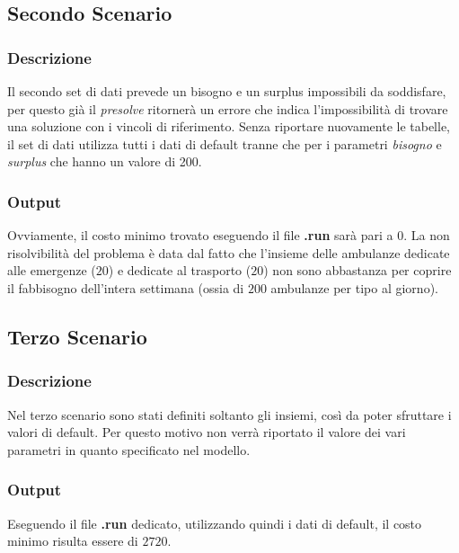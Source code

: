 \subsection{Secondo Scenario}
\subsubsection{Descrizione}
Il secondo set di dati prevede un bisogno e un surplus impossibili da soddisfare, per questo già il \textit{presolve} ritornerà un errore che indica l'impossibilità di trovare una soluzione con i vincoli di riferimento.
Senza riportare nuovamente le tabelle, il set di dati utilizza tutti i dati di default tranne che per i parametri \textit{bisogno} e \textit{surplus} che hanno un valore di 200.

\subsubsection{Output}
Ovviamente, il costo minimo trovato eseguendo il file \textbf{.run} sarà pari a \texteuro$0$. La non risolvibilità del problema è data dal fatto che l'insieme delle ambulanze dedicate alle emergenze ($20$) e dedicate al trasporto ($20$) non sono abbastanza per coprire il fabbisogno dell'intera settimana (ossia di $200$ ambulanze per tipo al giorno).

\subsection{Terzo Scenario}
\subsubsection{Descrizione}
Nel terzo scenario sono stati definiti soltanto gli insiemi, così da poter sfruttare i valori di default. Per questo motivo non verrà riportato il valore dei vari parametri in quanto specificato nel modello.
\subsubsection{Output}
Eseguendo il file \textbf{.run} dedicato, utilizzando quindi i dati di default, il costo minimo risulta essere di \texteuro$2720$.